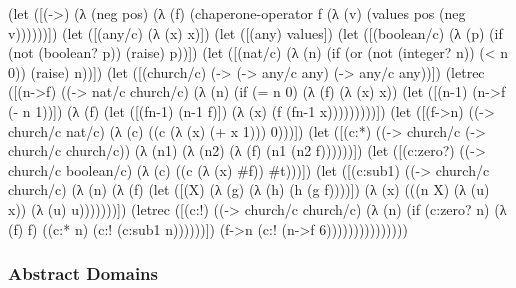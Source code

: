 \documentclass{sigplanconf}
\begin{document}
\begin{schemedisplay}
(let ([(->) (λ (neg pos) (λ (f) (chaperone-operator f (λ (v) (values pos (neg v))))))])
  (let ([(any/c) (λ (x) x)])
    (let ([(any) values])
      (let ([(boolean/c) (λ (p)
                           (if (not (boolean? p))
                               (raise)
                               p))])
        (let ([(nat/c) (λ (n)
                         (if (or (not (integer? n))
                                 (< n 0))
                             (raise)
                             n))])
          (let ([(church/c) (-> (-> any/c any)
                                (-> any/c any))])
            (letrec ([(n->f) ((-> nat/c church/c)
                              (λ (n)
                                (if (= n 0)
                                    (λ (f) (λ (x) x))
                                    (let ([(n-1) (n->f (- n 1))])
                                      (λ (f)
                                        (let ([(fn-1) (n-1 f)])
                                          (λ (x) (f (fn-1 x)))))))))])
              (let ([(f->n) ((-> church/c nat/c)
                             (λ (c)
                               ((c (λ (x) (+ x 1))) 0)))])
                (let ([(c:*) ((-> church/c (-> church/c church/c))
                              (λ (n1)
                                (λ (n2)
                                  (λ (f)
                                    (n1 (n2 f))))))])
                  (let ([(c:zero?) ((-> church/c boolean/c)
                                    (λ (c) ((c (λ (x) #f)) #t)))])
                    (let ([(c:sub1) ((-> church/c church/c)
                                     (λ (n)
                                       (λ (f)
                                         (let ([(X) (λ (g) (λ (h) (h (g f))))])
                                           (λ (x)
                                             (((n X)
                                               (λ (u) x))
                                              (λ (u) u)))))))])
                      (letrec ([(c:!) ((-> church/c church/c)
                                       (λ (n)
                                         (if (c:zero? n)
                                             (λ (f) f)
                                             ((c:* n) (c:! (c:sub1 n))))))])
                        (f->n (c:! (n->f 6)))))))))))))))
\end{schemedisplay}

\subsubsection{Abstract Domains}
\end{document}

